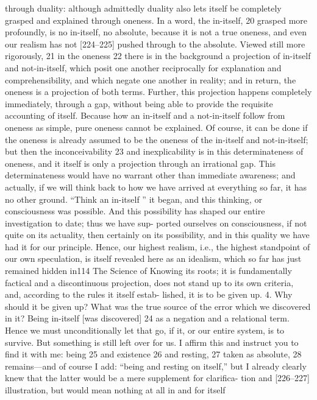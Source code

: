 through duality: although admittedly duality also lets itself be completely
grasped and explained through oneness. In a word, the in-itself, 20 grasped
more profoundly, is no in-itself, no absolute, because it is not a true oneness,
and even our realism has not [224–225] pushed through to the absolute.
Viewed still more rigorously, 21 in the oneness 22 there is in the background a
projection of in-itself and not-in-itself, which posit one another reciprocally
for explanation and comprehensibility, and which negate one another in
reality; and in return, the oneness is a projection of both terms. Further, this
projection happens completely immediately, through a gap, without being
able to provide the requisite accounting of itself. Because how an in-itself
and a not-in-itself follow from oneness as simple, pure oneness cannot be
explained. Of course, it can be done if the oneness is already assumed to be
the oneness of the in-itself and not-in-itself; but then the inconceivability 23
and inexplicability is in this determinateness of oneness, and it itself is only a
projection through an irrational gap. This determinateness would have no
warrant other than immediate awareness; and actually, if we will think back
to how we have arrived at everything so far, it has no other ground. “Think
an in-itself ” it began, and this thinking, or consciousness was possible. And
this possibility has shaped our entire investigation to date; thus we have sup-
ported ourselves on consciousness, if not quite on its actuality, then certainly
on its possibility, and in this quality we have had it for our principle. Hence,
our highest realism, i.e., the highest standpoint of our own speculation, is
itself revealed here as an idealism, which so far has just remained hidden in114
The Science of Knowing
its roots; it is fundamentally factical and a discontinuous projection, does
not stand up to its own criteria, and, according to the rules it itself estab-
lished, it is to be given up.
4. Why should it be given up? What was the true source of the error
which we discovered in it? Being in-itself [was discovered] 24 as a negation and
a relational term. Hence we must unconditionally let that go, if it, or our entire
system, is to survive. But something is still left over for us. I affirm this and
instruct you to find it with me: being 25 and existence 26 and resting, 27 taken as
absolute, 28 remains—and of course I add: “being and resting on itself,” but I
already clearly knew that the latter would be a mere supplement for clarifica-
tion and [226–227] illustration, but would mean nothing at all in and for itself
